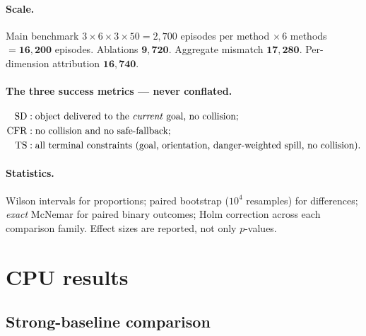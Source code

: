 \documentclass[11pt]{article}
\newcommand{\SD}{\mathrm{SD}}
\newcommand{\CFR}{\mathrm{CFR}}
\newcommand{\TS}{\mathrm{TS}}
\begin{document}
\paragraph{Scale.} Main benchmark $3\times6\times3\times50=2{,}700$ episodes per
method $\times\,6$ methods $=\mathbf{16{,}200}$ episodes. Ablations
$\mathbf{9{,}720}$. Aggregate mismatch $\mathbf{17{,}280}$. Per-dimension
attribution $\mathbf{16{,}740}$.

\paragraph{The three success metrics --- never conflated.}
\begin{align}
\SD  &: \text{object delivered to the \emph{current} goal, no collision;}\\
\CFR &: \text{no collision and no safe-fallback;}\\
\TS  &: \text{all terminal constraints (goal, orientation, danger-weighted spill, no collision).}
\end{align}

\paragraph{Statistics.} Wilson intervals for proportions; paired bootstrap
($10^4$ resamples) for differences; \emph{exact} McNemar for paired binary
outcomes; Holm correction across each comparison family. Effect sizes are
reported, not only $p$-values.

\section{CPU results}

\subsection{Strong-baseline comparison}
\end{document}
